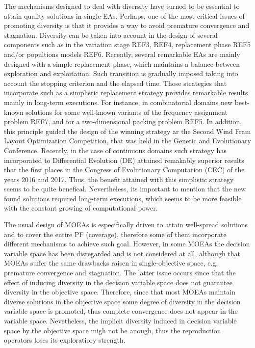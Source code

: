 The mechanisms designed to deal with diversity have turned to be essential to attain quality solutions in single-EAs.
%
Perhaps, one of the most critical issues of promoting diversity is that it provides a way to avoid premature convergence and stagnation.
%
Diversity can be taken into account in the design of several components such as in the variation stage REF3, REF4, replacement phase REF5 and/or popultions models REF6.
%
Recently, several remarkable EAs are mainly designed with a simple replacement phase, which maintains a balance between exploration and exploitation.
%
Such transition is gradually imposed taking into account the stopping criterion and the elapsed time.
%
Those strategies that incorporate such as a simplistic replacement strategy provides remarkable results mainly in long-term executions.
%
For instance, in combinatorial domains new best-known solutions for some well-known variants of the frequency assignment problem REF7, and for a two-dimensional packing problem REF5.
%
In addition, this principle guided the design of the winning strategy ar the Second Wind Fram Layout Optimization Competition, that was held in the Genetic and Evolutionary Conference.
%
Recently, in the case of continuous domains such strategy has incorporated to Differential Evolution (DE) attained remakably superior results that the first places in the Congress of Evolutionary Computation (CEC) of the years 2016 and 2017.
%
Thus, the benefit attained with this simplistic strategy seems to be quite benefical.
%
Nevertheless, its important to mention that the new found solutions required long-term executions, which seems to be more feasible with the constant growing of computational power.
%

The usual design of MOEAs is especifically driven to attain well-spread solutions and to cover the entire PF (coverage), therefore some of them incorporate different mechanisms to achieve such goal.
%
However, in some MOEAs the decision variable space has been disregarded and is not considered at all, although that MOEAs suffer the same drawbacks raisen in single-objective space, e.g. premature convergence and stagnation.
%
The latter issue occurs since that the effect of inducing diversity in the decision variable space does not guarantee diversity in the objective space.
%
Therefore, since that most MOEAs maintain diverse solutions in the objective space some degree of diversity in the decision variable space is promoted, thus complete convergence does not appear in the variable space.
%
Nevetheless, the implicit diversity induced in decision variable space by the objective space migh not be anough, thus the reproduction operators loses its exploratiory strength.
%


